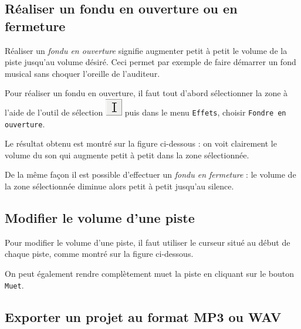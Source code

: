 




\subsection{Réaliser un fondu en ouverture ou en fermeture}\label{Son1fondu}

Réaliser un \emph{fondu en ouverture} signifie augmenter petit à petit le volume de la piste jusqu'au volume désiré. Ceci permet par exemple de faire démarrer un fond musical sans choquer l'oreille de l'auditeur.

Pour réaliser un fondu en ouverture, il faut tout d'abord sélectionner la zone à l'aide de l'outil de sélection  \includegraphics[width=.5cm]{./images/son01/audacityIconeSelection} puis dans le menu \texttt{Effets}, choisir \texttt{Fondre en ouverture}.  


Le résultat obtenu est montré sur la figure ci-dessous : on voit clairement le volume du son qui augmente petit à petit dans la zone sélectionnée.


De la même façon il est possible d'effectuer un \emph{fondu en fermeture} : le volume de la zone sélectionnée diminue alors petit à petit jusqu'au silence. 


\subsection{Modifier le volume d'une piste}\label{Son1volume}

Pour modifier le volume d'une piste, il faut utiliser le curseur situé au début de chaque piste, comme montré sur la figure ci-dessous.


On peut également rendre complètement muet la piste en cliquant sur le bouton \texttt{Muet}. 



\subsection{Exporter un projet au format MP3 ou WAV}\label{Son1export} 

